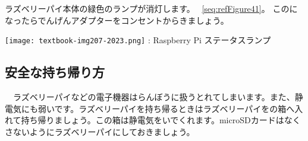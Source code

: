 \documentclass[a4paper,12pt]{jarticle}
\begin{document}
\bigskip
\flushleft
\textcolor[rgb]{0.13333334,0.13333334,0.13333334}{ラズベリーパイ本体の緑色のランプが消灯します。
  ~\ref{seq:refFigure41}。
  このになったらでんげんアダプターをコンセントからきましょう。}

\bigskip
\centering
\begin{minipage}{8.207cm}
  {\upshape
    \texttt{[image: textbook-img207-2023.png]}
    \newline
    {\theFigure\label{seq:refFigure41}}: Raspberry Pi
    ステータスランプ}
\end{minipage}
\clearpage\subsection{安全な持ち帰り方}
\flushleft
\ \ ラズベリーパイなどの電子機器はらんぼうに扱うとれてしまいます。また、静電気にも弱いです。ラズベリーパイを持ち帰るときはラズベリーパイをの箱へ入れて持ち帰りましょう。この箱は静電気をいでくれます。microSDカードはなくさないようにラズベリーパイにしておきましょう。

\clearpage
\end{document}
